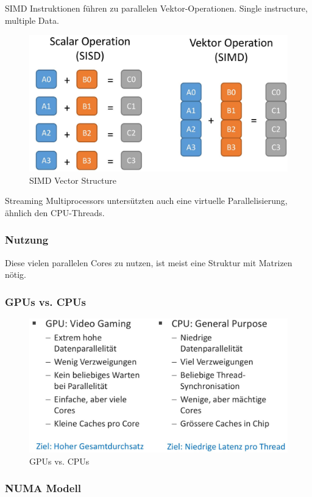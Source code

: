SIMD Instruktionen führen zu parallelen Vektor-Operationen. Single instructure, multiple Data.

\begin{figure}[h]
	\centering
	\includegraphics[width=0.7\linewidth]{img/simd_vektor.jpg}
	\caption{SIMD Vector Structure}
	\label{fig:simdvector}
\end{figure}

Streaming Multiprocessors untersützten auch eine virtuelle Parallelisierung, ähnlich den CPU-Threads.

\subsubsection{Nutzung}

Diese vielen parallelen Cores zu nutzen, ist meist eine Struktur mit Matrizen nötig.

\subsubsection{GPUs vs. CPUs}

\begin{figure}[h]
	\centering
	\includegraphics[width=0.7\linewidth]{img/gpu_vs_cpu.jpg}
	\caption{GPUs vs. CPUs}
	\label{fig:gpuvscpu}
\end{figure}

\subsubsection{NUMA Modell}

